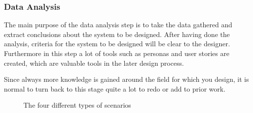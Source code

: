 \subsubsection{Data Analysis}
\label{sec:1_data_analysis}
The main purpose of the data analysis step is to take the data gathered and
extract conclusions about the system to be designed. After having done the
analysis, criteria for the system to be designed will be clear to the designer.
Furthermore in this step a lot of tools such as personas and user stories are
created, which are valuable tools in the later design process.

Since always more knowledge is gained around the field for which you design, it
is normal to turn back to this stage quite a lot to redo or add to prior work.

\begin{method} \label{meth:affinity_diagram} 
  
\end{method}

\begin{method} \label{meth:rich_picture} 
  
\end{method}

\begin{tool}[Persona] \label{tool:persona} 
  
\end{tool}

\begin{tool} \label{tool:user_stories} 
  
\end{tool}

\begin{figure}
  \centering
  \caption{The four different types of scenarios \cite[p. 67]{benyon_14}}
  \label{fig:scenarios}
\end{figure}

\begin{method} \label{meth:flow_model} 
  
\end{method}

\begin{method} \label{meth:sequence_model} 
  
\end{method}
